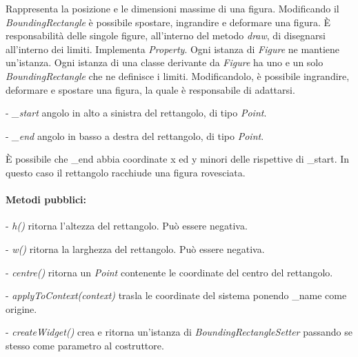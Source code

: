 Rappresenta la posizione e le dimensioni massime di una figura. Modificando il
\textit{BoundingRectangle} \`e possibile spostare, ingrandire e deformare una figura.
\`E responsabilit\`a delle singole figure, all'interno del metodo \textit{draw}, di disegnarsi all'interno dei limiti.
Implementa \textit{Property}. Ogni istanza di \textit{Figure} ne mantiene un'istanza.
Ogni istanza di una classe derivante da \textit{Figure} ha uno e un solo \textit{BoundingRectangle} che ne definisce i limiti. Modificandolo, \`e possibile ingrandire, deformare e spostare una figura, la quale \`e responsabile di adattarsi.
\begin{elencopuntato}[\normindent]
\item[-] \textit{{\_}start} angolo in alto a sinistra del rettangolo, di tipo \textit{Point}.
\item[-] \textit{{\_}end} angolo in basso a destra del rettangolo, di tipo \textit{Point}.
\end{elencopuntato}
\`E possibile che {\_}end abbia coordinate x ed y minori delle rispettive di {\_}start. In questo caso il rettangolo racchiude una figura rovesciata.
\paragraph{Metodi pubblici:}
\begin{elencopuntato}[\normindent]
\item[-] \textit{h()} ritorna l'altezza del rettangolo. Pu\`o essere negativa.
\item[-] \textit{w()} ritorna la larghezza del rettangolo. Pu\`o essere negativa.
\item[-] \textit{centre()} ritorna un \textit{Point} contenente le coordinate del centro del rettangolo.
\item[-] \textit{applyToContext(context)} trasla le coordinate del sistema ponendo {\_}name come origine.
\item[-] \textit{createWidget()} crea e ritorna un'istanza di \textit{BoundingRectangleSetter} passando se stesso come parametro al costruttore.
\end{elencopuntato}

